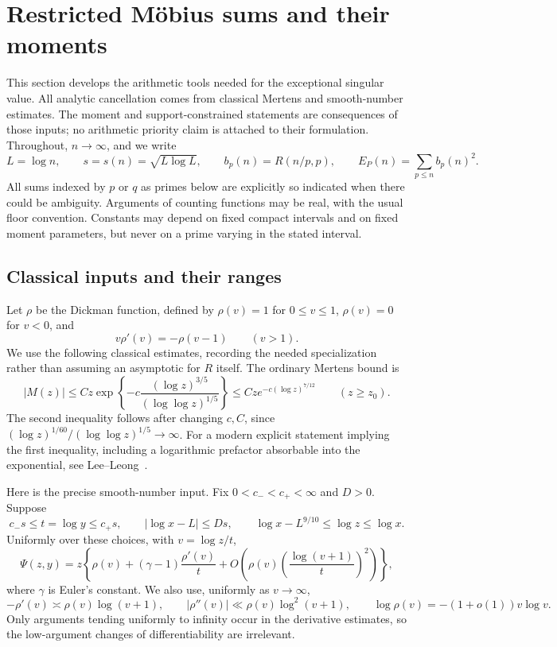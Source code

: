 \section{Restricted M\"obius sums and their moments}\label{sec:arithmetic}

This section develops the arithmetic tools needed for the exceptional singular
value. All analytic cancellation comes from classical Mertens and smooth-number
estimates. The moment and support-constrained statements are consequences of
those inputs; no arithmetic priority claim is attached to their formulation.
Throughout, $n\to\infty$, and we write
\[
 L=\log n,\qquad s=s(n)=\sqrt{L\log L},\qquad
 b_p(n)=R(n/p,p),\qquad E_P(n)=\sum_{p\le n}b_p(n)^2.
\]
All sums indexed by $p$ or $q$ as primes below are explicitly so indicated when
there could be ambiguity. Arguments of counting functions may be real, with the
usual floor convention. Constants may depend on fixed compact intervals and on
fixed moment parameters, but never on a prime varying in the stated interval.

\subsection{Classical inputs and their ranges}

Let $\rho$ be the Dickman function, defined by $\rho(v)=1$ for $0\le v\le1$,
$\rho(v)=0$ for $v<0$, and
\[
 v\rho'(v)=-\rho(v-1)\qquad(v>1).
\]
We use the following classical estimates, recording the needed specialization
rather than assuming an asymptotic for $R$ itself. The ordinary Mertens bound is
\begin{equation}\label{arith:mertens}
 |M(z)|\le C z\exp\left\{-c\frac{(\log z)^{3/5}}
 {(\log\log z)^{1/5}}\right\}
 \le C z e^{-c(\log z)^{7/12}}\qquad(z\ge z_0).
\end{equation}
The second inequality follows after changing $c,C$, since
$(\log z)^{1/60}/(\log\log z)^{1/5}\to\infty$.
For a modern explicit statement implying the first inequality, including a
logarithmic prefactor absorbable into the exponential, see
Lee--Leong~\cite[Theorem~1.1, (12)]{leeleong}.

Here is the precise smooth-number input. Fix $0<c_-<c_+<\infty$ and $D>0$.
Suppose
\[
 c_-s\le t=\log y\le c_+s,\qquad
 |\log x-L|\le Ds,\qquad
 \log x-L^{9/10}\le\log z\le\log x.
\]
Uniformly over these choices, with $v=\log z/t$,
\begin{equation}\label{arith:smooth-input}
 \Psi(z,y)=z\left\{\rho(v)+(\gamma-1)\frac{\rho'(v)}t
 +O\left(\rho(v)\left(\frac{\log(v+1)}t\right)^2\right)\right\},
\end{equation}
where $\gamma$ is Euler's constant. We also use, uniformly as $v\to\infty$,
\begin{equation}\label{arith:dickman-input}
 -\rho'(v)\asymp\rho(v)\log(v+1),\qquad
 |\rho''(v)|\ll\rho(v)\log^2(v+1),\qquad
 \log\rho(v)=-(1+o(1))v\log v.
\end{equation}
Only arguments tending uniformly to infinity occur in the derivative estimates,
so the low-argument changes of differentiability are irrelevant.

